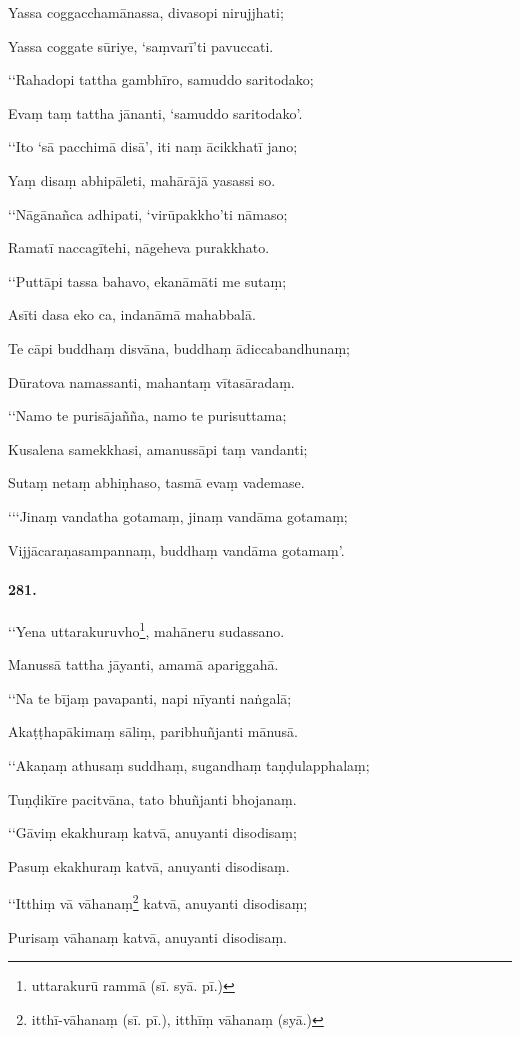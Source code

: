 Yassa coggacchamānassa, divasopi nirujjhati;

Yassa coggate sūriye, ‘saṃvarī’ti pavuccati.

‘‘Rahadopi tattha gambhīro, samuddo saritodako;

Evaṃ taṃ tattha jānanti, ‘samuddo saritodako’.

‘‘Ito ‘sā pacchimā disā’, iti naṃ ācikkhatī jano;

Yaṃ disaṃ abhipāleti, mahārājā yasassi so.

‘‘Nāgānañca adhipati, ‘virūpakkho’ti nāmaso;

Ramatī naccagītehi, nāgeheva purakkhato.

‘‘Puttāpi tassa bahavo, ekanāmāti me sutaṃ;

Asīti dasa eko ca, indanāmā mahabbalā.

Te cāpi buddhaṃ disvāna, buddhaṃ ādiccabandhunaṃ;

Dūratova namassanti, mahantaṃ vītasāradaṃ.

‘‘Namo te purisājañña, namo te purisuttama;

Kusalena samekkhasi, amanussāpi taṃ vandanti;

Sutaṃ netaṃ abhiṇhaso, tasmā evaṃ vademase.

‘‘‘Jinaṃ vandatha gotamaṃ, jinaṃ vandāma gotamaṃ;

Vijjācaraṇasampannaṃ, buddhaṃ vandāma gotamaṃ’.

\paragraph{281.} ‘‘Yena uttarakuruvho\footnote{uttarakurū rammā (sī. syā. pī.)}, mahāneru sudassano.

Manussā tattha jāyanti, amamā apariggahā.

‘‘Na te bījaṃ pavapanti, napi nīyanti naṅgalā;

Akaṭṭhapākimaṃ sāliṃ, paribhuñjanti mānusā.

‘‘Akaṇaṃ athusaṃ suddhaṃ, sugandhaṃ taṇḍulapphalaṃ;

Tuṇḍikīre pacitvāna, tato bhuñjanti bhojanaṃ.

‘‘Gāviṃ ekakhuraṃ katvā, anuyanti disodisaṃ;

Pasuṃ ekakhuraṃ katvā, anuyanti disodisaṃ.

‘‘Itthiṃ vā vāhanaṃ\footnote{itthī-vāhanaṃ (sī. pī.), itthīṃ vāhanaṃ (syā.)} katvā, anuyanti disodisaṃ;

Purisaṃ vāhanaṃ katvā, anuyanti disodisaṃ.

